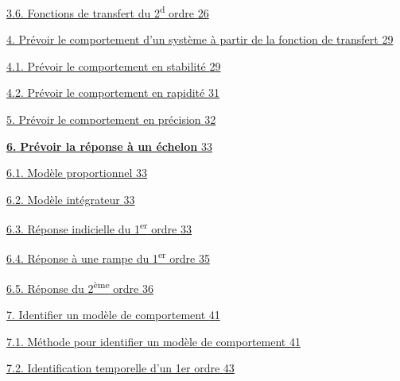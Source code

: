 \protect\hyperlink{fonctions-de-transfert-du-2d-ordre}{3.6. Fonctions de transfert du 2\textsuperscript{d} ordre \protect\hyperlink{fonctions-de-transfert-du-2d-ordre}{26}}

\protect\hyperlink{pruxe9voir-le-comportement-dun-systuxe8me-uxe0-partir-de-la-fonction-de-transfert}{4. Prévoir le comportement d'un système à partir de la fonction de transfert \protect\hyperlink{pruxe9voir-le-comportement-dun-systuxe8me-uxe0-partir-de-la-fonction-de-transfert}{29}}

\protect\hyperlink{pruxe9voir-le-comportement-en-stabilituxe9}{4.1. Prévoir le comportement en stabilité \protect\hyperlink{pruxe9voir-le-comportement-en-stabilituxe9}{29}}

\protect\hyperlink{pruxe9voir-le-comportement-en-rapidituxe9}{4.2. Prévoir le comportement en rapidité \protect\hyperlink{pruxe9voir-le-comportement-en-rapidituxe9}{31}}

\protect\hyperlink{pruxe9voir-le-comportement-en-pruxe9cision}{5. Prévoir le comportement en précision \protect\hyperlink{pruxe9voir-le-comportement-en-pruxe9cision}{32}}

\protect\hyperlink{_Toc99121097}{\textbf{6.} \textbf{Prévoir la réponse à un échelon} \protect\hyperlink{_Toc99121097}{33}}

\protect\hyperlink{_Toc99121098}{6.1. Modèle proportionnel \protect\hyperlink{_Toc99121098}{33}}

\protect\hyperlink{_Toc272938046}{6.2. Modèle intégrateur \protect\hyperlink{_Toc272938046}{33}}

\protect\hyperlink{_Toc379198200}{6.3. Réponse indicielle du 1\textsuperscript{er} ordre \protect\hyperlink{_Toc379198200}{33}}

\protect\hyperlink{_Toc99121102}{6.4. Réponse à une rampe du 1\textsuperscript{er} ordre \protect\hyperlink{_Toc99121102}{35}}

\protect\hyperlink{_Toc99121103}{6.5. Réponse du 2\textsuperscript{ème} ordre \protect\hyperlink{_Toc99121103}{36}}

\protect\hyperlink{identifier-un-moduxe8le-de-comportement}{7. Identifier un modèle de comportement \protect\hyperlink{identifier-un-moduxe8le-de-comportement}{41}}

\protect\hyperlink{muxe9thode-pour-identifier-un-moduxe8le-de-comportement}{7.1. Méthode pour identifier un modèle de comportement \protect\hyperlink{muxe9thode-pour-identifier-un-moduxe8le-de-comportement}{41}}

\protect\hyperlink{identification-temporelle-dun-1er-ordre}{7.2. Identification temporelle d'un 1er ordre \protect\hyperlink{identification-temporelle-dun-1er-ordre}{43}}

